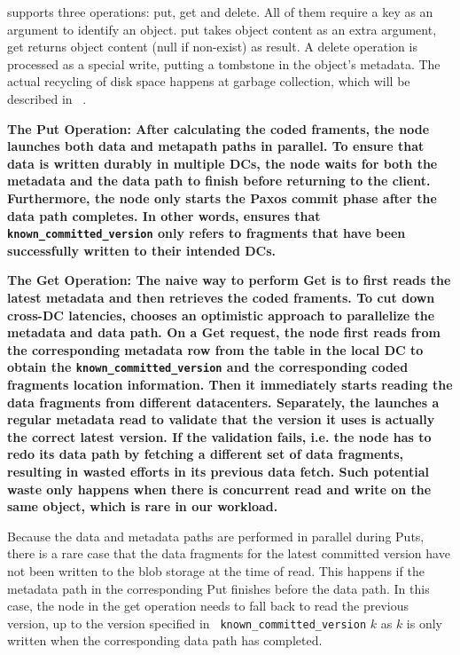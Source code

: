 {\name} supports three operations: put, get and delete. All of them require a key as
an argument to identify an object. put takes object content as an extra argument, get
returns object content (null if non-exist) as result. A delete operation is processed
as a special write, putting a tombstone in the object's metadata. The actual recycling
of disk space happens at garbage collection, which will be described in ~.

\bf{The Put Operation:}
After calculating the coded framents, the \name node launches both data and
metapath paths in parallel.  To ensure that data is written durably in multiple
DCs, the \name node waits for both the metadata and the data path to finish
before returning to the client.  Furthermore, the \name node only starts 
the Paxos commit phase after the data path completes. In other words, \name 
ensures that {\tt known\_committed\_version} only refers to fragments
that have been successfully written to their intended DCs.
 
\bf{The Get Operation:}
The naive way to perform Get is to first reads the latest metadata and then retrieves 
the coded framents. 
To cut down cross-DC latencies, {\name} chooses an optimistic approach to parallelize the metadata and data path.
On a Get request, the {\name} node first reads from the corresponding metadata row from the table in the local DC
to obtain the {\tt known\_committed\_version} and the corresponding coded 
fragments location information. Then it immediately starts reading the data fragments from different
datacenters.  Separately, the {\name} launches a regular metadata read to validate that the version it uses is actually
the correct latest version. If the validation fails, i.e. the \name node
has to redo its data path by fetching a different set of data fragments,
resulting in wasted efforts in its previous data fetch.  Such potential waste
only happens when there is concurrent read and write on the same object, which
is rare in our workload.

Because the data and metadata paths are performed in parallel during Puts,
there is a rare case that the data fragments for the latest committed version
have not been written to the blob storage at the time of read. This happens if 
the metadata path in the corresponding Put finishes before the data path. In
this case, the {\name} node in the get operation needs to fall back to read the
previous version, up to the version specified in {\tt
known\_committed\_version} $k$ as $k$ is only written when the corresponding
data path has completed.

